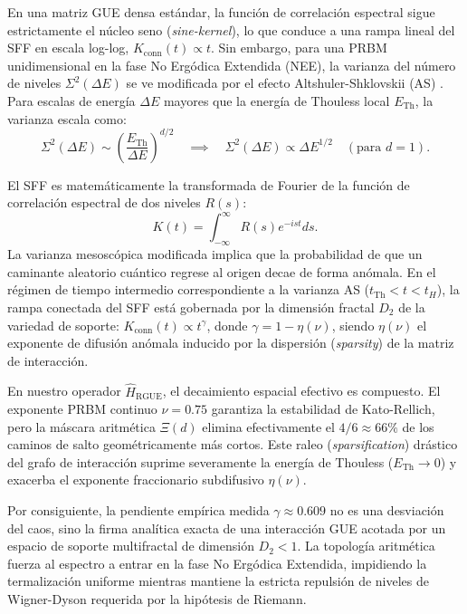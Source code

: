 \documentclass[aps,prl,preprint,superscriptaddress,floatfix]{revtex4-2}
\begin{document}
En una matriz GUE densa estándar, la función de correlación espectral sigue estrictamente el núcleo seno (\textit{sine-kernel}), lo que conduce a una rampa lineal del SFF en escala log-log, $K_{\text{conn}}(t) \propto t$. Sin embargo, para una PRBM unidimensional en la fase No Ergódica Extendida (NEE), la varianza del número de niveles $\Sigma^2(\Delta E)$ se ve modificada por el efecto Altshuler-Shklovskii (AS) \cite{Erdos2013, Erdos2015}. Para escalas de energía $\Delta E$ mayores que la energía de Thouless local $E_{\text{Th}}$, la varianza escala como:
\begin{equation}
\Sigma^2(\Delta E) \sim \left(\frac{E_{\text{Th}}}{\Delta E}\right)^{d/2} \quad \implies \quad \Sigma^2(\Delta E) \propto \Delta E^{1/2} \quad (\text{para } d=1).
\end{equation}

El SFF es matemáticamente la transformada de Fourier de la función de correlación espectral de dos niveles $R(s)$:
\begin{equation}
K(t) = \int_{-\infty}^{\infty} R(s) e^{-ist} ds.
\end{equation}
La varianza mesoscópica modificada implica que la probabilidad de que un caminante aleatorio cuántico regrese al origen decae de forma anómala. En el régimen de tiempo intermedio correspondiente a la varianza AS ($t_{\text{Th}} < t < t_H$), la rampa conectada del SFF está gobernada por la dimensión fractal $D_2$ de la variedad de soporte: $K_{\text{conn}}(t) \propto t^{\gamma}$, donde $\gamma = 1 - \eta(\nu)$, siendo $\eta(\nu)$ el exponente de difusión anómala inducido por la dispersión (\textit{sparsity}) de la matriz de interacción. 

En nuestro operador $\hat{H}_{\text{RGUE}}$, el decaimiento espacial efectivo es compuesto. El exponente PRBM continuo $\nu=0.75$ garantiza la estabilidad de Kato-Rellich, pero la máscara aritmética $\Xi(d)$ elimina efectivamente el $4/6 \approx 66\%$ de los caminos de salto geométricamente más cortos. Este raleo (\textit{sparsification}) drástico del grafo de interacción suprime severamente la energía de Thouless ($E_{\text{Th}} \to 0$) y exacerba el exponente fraccionario subdifusivo $\eta(\nu)$.

Por consiguiente, la pendiente empírica medida $\gamma \approx 0.609$ no es una desviación del caos, sino la firma analítica exacta de una interacción GUE acotada por un espacio de soporte multifractal de dimensión $D_2 < 1$. La topología aritmética fuerza al espectro a entrar en la fase No Ergódica Extendida, impidiendo la termalización uniforme mientras mantiene la estricta repulsión de niveles de Wigner-Dyson requerida por la hipótesis de Riemann.



\end{document}
